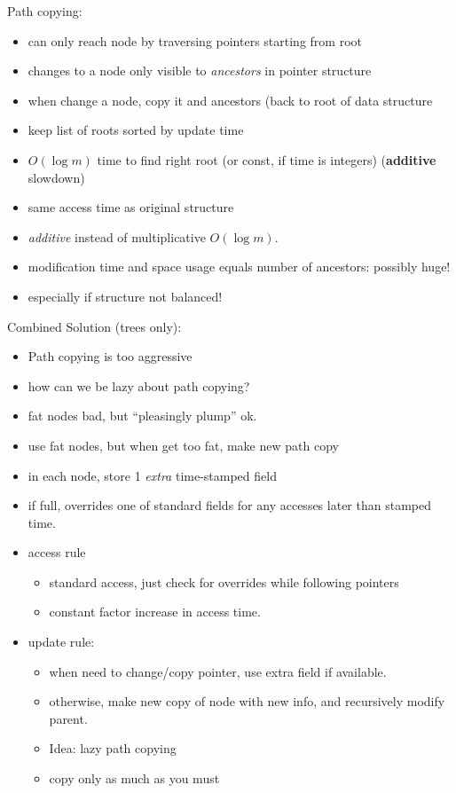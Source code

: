 \documentclass{article}
\begin{document}
Path copying:
\begin{itemize}
\item can only reach node by traversing pointers starting from root
\item changes to a node only visible to \emph{ancestors} in pointer
  structure
\item when change a node, copy it and ancestors (back to root of
  data structure
\item keep list of roots sorted by update time
\item $O(\log m)$ time to find right root (or const, if time is
  integers) (\textbf{additive} slowdown)
\item same access time as original structure
\item \emph{additive} instead of multiplicative $O(\log m)$.
\item modification time and space usage equals number of ancestors:
  possibly huge!
\item especially if structure not balanced!
\end{itemize}

Combined Solution (trees only):
\begin{itemize}
\item Path copying is too aggressive
\item how can we be lazy about path copying?
\item fat nodes bad, but ``pleasingly plump'' ok.
\item use fat nodes, but when get too fat, make new path copy
\item in each node, store 1 \emph{extra} time-stamped field
\item if full, overrides one of standard fields for any accesses
  later than stamped time.
\item access rule
\begin{itemize}
\item standard access, just check for overrides while following
  pointers
\item constant factor increase in access time.
\end{itemize}
\item update rule: 
\begin{itemize}
\item when need to change/copy pointer, use extra field if available.
\item otherwise, make new copy of node with new info, and recursively
  modify parent.
\item Idea: lazy path copying
\item copy only as much as you must
\end{itemize}
\end{itemize}
\end{document}
